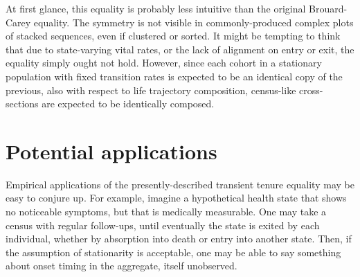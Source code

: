 \documentclass[12pt,oneside,a4paper]{article}
\theoremstyle{definition}
\begin{document}

At first glance, this equality is probably less intuitive than the
original Brouard-Carey equality. The symmetry is not visible in commonly-produced complex plots of
stacked sequences, even if clustered or sorted. It might
be tempting to think that due to state-varying vital rates, or the lack of alignment on entry or exit, the equality simply ought not hold. However, since each cohort in a
stationary population with fixed transition rates is expected to be an identical copy of the previous, also with respect to life trajectory composition, census-like cross-sections are expected to be identically composed.

\section{Potential applications}
Empirical applications of the presently-described transient tenure equality may
be easy to conjure up. For example, imagine a hypothetical health state that
shows no noticeable symptoms, but that is medically measurable. One
may take a census with regular follow-ups, until eventually the state is exited
by each individual, whether by absorption into death or entry into another
state. Then, if the assumption of stationarity is acceptable, one may be able to
say something about onset timing in the aggregate, itself unobserved. %
\end{document}
